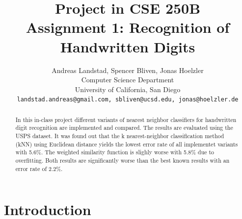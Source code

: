 \documentclass[10pt,twocolumn,letterpaper]{article}
\begin{document}
\title{
Project in CSE 250B\\
Assignment 1: Recognition of Handwritten Digits}

\author{Andreas Landstad, Spencer Bliven, Jonas Hoelzler\\
Computer Science Department\\
University of California, San Diego\\
{\tt\small landstad.andreas@gmail.com, sbliven@ucsd.edu, jonas@hoelzler.de}
}%
\maketitle
\thispagestyle{empty}

\begin{abstract}
In this in-class project different variants of nearest neighbor classifiers for handwritten digit recognition are implemented and compared. The results are evaluated using the USPS dataset. It was found out that the k nearest-neighbor classification method (kNN) using Euclidean distance yields the lowest error rate of all implementet variants with 5.6\%.
The weighted similarity function is slighly worse with 5.8\% due to overfitting.   
Both results are significantly worse than the best known results with an error rate of 2.2\%.
\end{abstract}

\section{Introduction}
\end{document}
